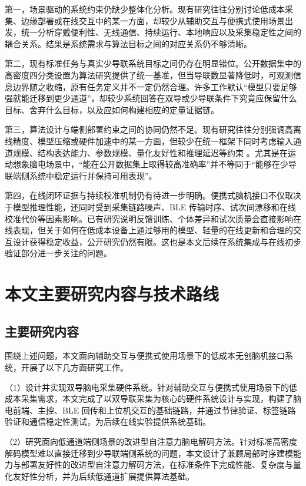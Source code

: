 第一，场景驱动的系统约束仍缺少整体化分析。现有研究往往分别讨论低成本采集、边缘部署或在线交互中的某一方面，却较少从辅助交互与便携式使用场景出发，统一分析穿戴便利性、无线通信、持续运行、本地响应以及采集稳定性之间的耦合关系。结果是系统需求与算法目标之间的对应关系仍不够清晰。

第二，现有标准任务与真实少导联系统目标之间仍存在明显错位。公开数据集中的高密度四分类设置为算法研究提供了统一基准，但当导联数显著降低时，可观测信息边界随之收缩，原有任务定义并不一定仍然合理。许多工作默认“模型只要足够强就能迁移到更少通道”，却较少系统回答在双导或少导联条件下究竟应保留什么目标、舍弃什么目标，以及应如何构建相应的定量证据链。

第三，算法设计与端侧部署约束之间的协同仍然不足。现有研究往往分别强调高离线精度、模型压缩或硬件加速中的某一方面，但较少在统一框架下同时考虑输入通道规模、结构表达能力、参数规模、量化友好性和推理延迟等约束 \cite{keu2024compact, wan2023novel, hua2023improved}。尤其是在运动想象脑电场景中，“能在公开数据集上取得较高准确率”并不等同于“能够在少导联端侧系统中稳定运行并保持可用表现”。

第四，在线闭环证据与持续校准机制仍有待进一步明确。便携式脑机接口不仅取决于模型推理性能，还同时受到采集链路噪声、BLE 传输时序、试次间漂移和在线校准代价等因素影响。已有研究说明反馈训练、个体差异和试次质量会直接影响在线表现，但关于如何在低成本设备上通过够用的模型、轻量的在线更新和合理的交互设计获得稳定收益，公开研究仍然有限。这也是本文后续在系统集成与在线初步验证部分进一步关注的问题。

\section{本文主要研究内容与技术路线}
\subsection{主要研究内容}

围绕上述问题，本文面向辅助交互与便携式使用场景下的低成本无创脑机接口系统，开展了以下几方面研究工作。

（1）设计并实现双导脑电采集硬件系统。针对辅助交互与便携式使用场景下的低成本采集需求，本文完成了以双导联采集为核心的硬件系统设计与实现，构建了脑电前端、主控、BLE 回传和上位机交互的基础链路，并通过节律验证、标签链路验证和通信稳定性测试，为后续在线实验提供系统基础。

（2）研究面向低通道端侧场景的改进型自注意力脑电解码方法。针对标准高密度解码模型难以直接迁移到少导联端侧系统的问题，本文设计了兼顾局部时序建模能力与部署友好性的改进型自注意力解码方法，在标准条件下完成性能、复杂度与量化友好性分析，并为后续低通道扩展提供算法基础。

